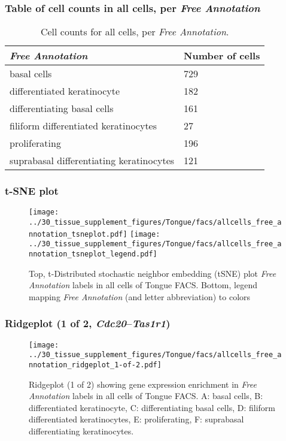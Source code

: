\subsubsection{Table of cell counts in all cells, per \emph{Free Annotation}}\begin{table}[h]
\centering
\label{my-label}
\begin{tabular}{@{}ll@{}}
\toprule

\emph{Free Annotation}& Number of cells \\ \midrule
basal cells & 729 \\

differentiated keratinocyte & 182 \\

differentiating basal cells & 161 \\

filiform differentiated keratinocytes & 27 \\

proliferating & 196 \\

suprabasal differentiating keratinocytes & 121 \\
\bottomrule
\end{tabular}
\caption{Cell counts for all cells, per \emph{Free Annotation}.}
\end{table}

\clearpage
\subsubsection{t-SNE plot}
\begin{figure}[h]
\centering
\texttt{[image: ../30\_tissue\_supplement\_figures/Tongue/facs/allcells\_free\_annotation\_tsneplot.pdf]}
\texttt{[image: ../30\_tissue\_supplement\_figures/Tongue/facs/allcells\_free\_annotation\_tsneplot\_legend.pdf]}
\caption{Top, t-Distributed stochastic neighbor embedding (tSNE) plot  \emph{Free Annotation} labels in all cells of Tongue FACS. Bottom, legend mapping \emph{Free Annotation} (and letter abbreviation) to colors}
\end{figure}


\clearpage

\subsubsection{Ridgeplot (1 of 2, \emph{Cdc20}--\emph{Tas1r1})}
\begin{figure}[h]
\centering
\texttt{[image: ../30\_tissue\_supplement\_figures/Tongue/facs/allcells\_free\_annotation\_ridgeplot\_1-of-2.pdf]}

\caption{ Ridgeplot (1 of 2)  showing gene expression enrichment in \emph{Free Annotation} labels in all cells of Tongue FACS. A: basal cells, B: differentiated keratinocyte, C: differentiating basal cells, D: filiform differentiated keratinocytes, E: proliferating, F: suprabasal differentiating keratinocytes.}
\end{figure}


